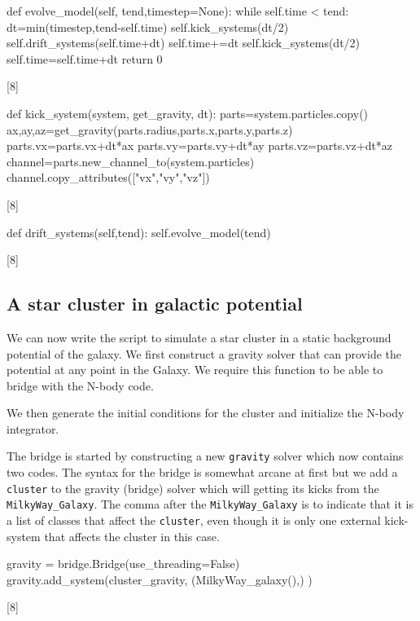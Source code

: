 \begin{verbatimtab}[8]
    def evolve_model(self, tend,timestep=None):
        while self.time < tend:    
            dt=min(timestep,tend-self.time)
            self.kick_systems(dt/2)   
            self.drift_systems(self.time+dt)
            self.time+=dt
            self.kick_systems(dt/2)
            self.time=self.time+dt
        return 0    
\end{verbatimtab}[8]

\begin{verbatimtab}[8]
def kick_system(system, get_gravity, dt):
    parts=system.particles.copy()
    ax,ay,az=get_gravity(parts.radius,parts.x,parts.y,parts.z)
    parts.vx=parts.vx+dt*ax
    parts.vy=parts.vy+dt*ay
    parts.vz=parts.vz+dt*az
    channel=parts.new_channel_to(system.particles)
    channel.copy_attributes(["vx","vy","vz"])   
\end{verbatimtab}[8]


\begin{verbatimtab}[8]
    def drift_systems(self,tend):
    self.evolve_model(tend)
\end{verbatimtab}[8]

\subsection{A star cluster in galactic potential}

We can now write the script to simulate a star cluster in a static
background potential of the galaxy.  We first construct a gravity
solver that can provide the potential at any point in the Galaxy. We
require this function to be able to bridge with the N-body code.

We then generate the initial conditions for the cluster and initialize
the N-body integrator.

The bridge is started by constructing a new {\tt gravity} solver which
now contains two codes. The syntax for the bridge is somewhat arcane
at first but we add a {\tt cluster} to the gravity (bridge) solver
which will getting its kicks from the {\tt MilkyWay\_Galaxy}.  The
comma after the {\tt MilkyWay\_Galaxy} is to indicate that it is a
list of classes that affect the {\tt cluster}, even though it is only
one external kick-system that affects the cluster in this case.
\begin{verbatimtab}[8]
    gravity = bridge.Bridge(use_threading=False)
    gravity.add_system(cluster_gravity, (MilkyWay_galaxy(),) )
\end{verbatimtab}[8]

